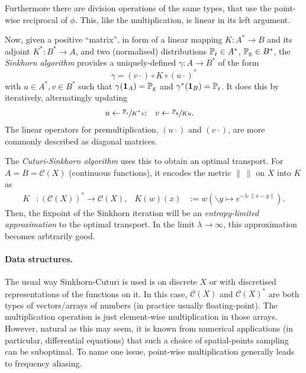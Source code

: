 \documentclass[a4paper]{easychair}
\begin{document}
Furthermore there are division operations of the same types, that use the point-wise reciprocal of $\phi$. This, like the multiplication, is linear in its left argument.

Now, given a positive “matrix”, in form of a linear mapping $K: A^\ast\to B$ and its adjoint $K^\ast: B^\ast\to A$, and two (normalised) distributions $\mathbb{P}_\mathrm{r}\in A^\ast$, $\mathbb{P}_\mathrm{g}\in B^\ast$, the \emph{Sinkhorn algorithm}\cite{SinkhornDiagEquivlc} provides a uniquely-defined $\gamma: A\to B^\ast$ of the form
\[
  \gamma = (v\cdot) \circ K \circ (u\cdot)^\ast
\]
with $u\in A^\ast, v\in B^\ast$ such that $\gamma(\mathbf{1}_A)=\mathbb{P}_\mathrm{g}$ and $\gamma^\ast(\mathbf{1}_B)=\mathbb{P}_\mathrm{r}$. It does this by iteratively, alternatingly updating
\[\begin{aligned}
  u &\leftarrow \sfrac{\mathbb{P}_\mathrm{r}}{K^\ast v};
   & v &\leftarrow \sfrac{\mathbb{P}_\mathrm{g}}{K u}.
\end{aligned}\]
The linear operators for premultiplication, $(u\cdot)$ and $(v\cdot)$, are more commonly described as diagonal matrices.

The \emph{Cuturi-Sinkhorn algorithm}\cite{CuturiSinkhornLightspeed} uses this to obtain an optimal transport. For $A=B=\mathcal{C}(X)$ (continuous functions), it encodes the metric $\|\ \|$ on $X$ into $K$ as
\[\begin{aligned}
  K&:(\mathcal{C}(X))^\ast \to \mathcal{C}(X), & K(w)(x) &:= w(\backslash y \mapsto e^{-\lambda\cdot\|x-y\|}).
\end{aligned}\]
Then, the fixpoint of the Sinkhorn iteration will be an \emph{entropy-limited approximation} to the optimal transport. In the limit $\lambda\to\infty$, this approximation becomes arbtrarily good.


\paragraph{Data structures.}
The usual way Sinkhorn-Cuturi is used is on discrete $X$ or with discretised representations of the functions on it. In this case, $\mathcal{C}(X)$ and $\mathcal{C}(X)^\ast$ are both types of vectors/arrays of numbers (in practice usually floating-point). The multiplication operation is just element-wise multiplication in those arrays.
However, natural as this may seem, it is known from numerical applications (in particular, differential equations) that such a choice of spatial-points sampling can be suboptimal. To name one issue, point-wise multiplication generally leads to frequency aliasing.
\end{document}
